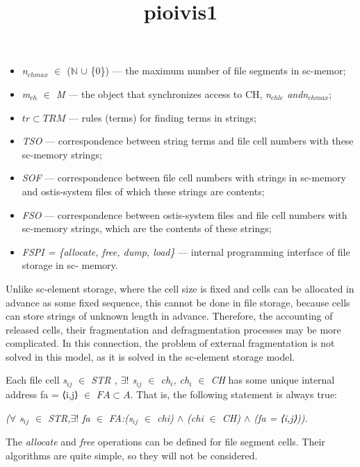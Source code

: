 \documentclass[10pt, a4paper]{article}
\title{pioivis1}
\begin{document}
\begin{multicols}{2}

\begin{itemize}
\setlength{\parskip}{0pt}
\setlength{\itemsep}{0pt}
    \item \textit{n$_{chmax}$} $\in$  ($\mathbb{N}$ $\cup$ \{0\}) — the maximum number of file segments in sc-memor;
    \item \textit{m$_{ch}$ $\in$ M} — the object that synchronizes access to CH, \textit{n$_{chle}$ andn$_{chmax}$};
    \item \textit{$tr \subset TRM$} — rules (terms) for finding terms in strings;
    \item \textit{TSO} — correspondence between string terms and file cell numbers with these sc-memory strings;
    \item \textit{SOF} — correspondence between file cell numbers with strings in sc-memory and ostis-system files of which these strings are contents;
    \item \textit{FSO} — correspondence between ostis-system files and file cell numbers with sc-memory strings, which are the contents of these strings;
    \item \textit{FSPI = \{allocate, free, dump, load\}} — internal programming interface of file storage in sc- memory.
\end{itemize}

Unlike sc-element storage, where the cell size is fixed and cells can be allocated in advance as some fixed sequence, this cannot be done in file storage, because cells can store strings of unknown length in advance. Therefore, the accounting of released cells, their fragmentation and defragmentation processes may be more complicated. In this connection, the problem of external fragmentation is not solved in this model, as it is solved in the sc-element storage model.

Each file cell \textit{s$_{ij}$ $\in$ STR , $\exists!$ s$_{ij}$ $\in$ ch$_{i}$, ch$_{i}$ $\in$ CH} has some unique internal address fa = ⟨i,j⟩ $\in$ $FA \subset A$. That is, the following statement is always true:
\begin{center}
    \textit{($\forall$ s$_{ij}$ $\in$ STR,$\exists!$ fa $\in$ FA:(s$_{ij}$ $\in$ chi) $\land$ (chi $\in$ CH) $\land$ (fa = ⟨i,j⟩))}.
\end{center}

The \textit{allocate} and \textit{free} operations can be defined for file segment cells. Their algorithms are quite simple, so they will not be considered.


\end{multicols}
\end{document}
